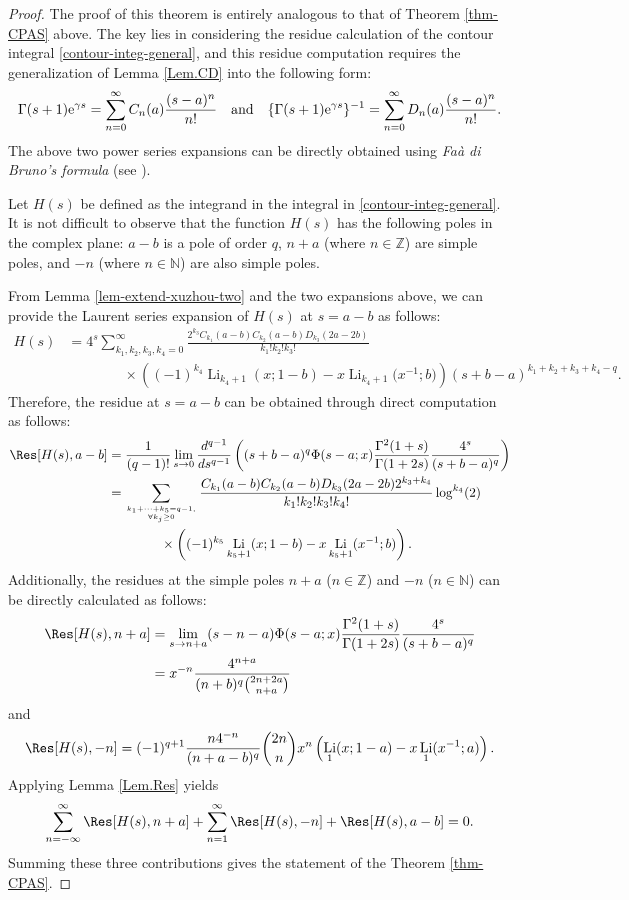 \documentclass[11pt]{article}
\DeclareMathOperator{\Li}{Li}
\theoremstyle{plain}
\theoremstyle{definition}
\begin{document}
\begin{proof}
The proof of this theorem is entirely analogous to that of Theorem \ref{thm-CPAS} above. The key lies in considering the residue calculation of the contour integral \eqref{contour-integ-general}, and this residue computation requires the generalization of Lemma \ref{Lem.CD} into the following form:
\[
\Gamma(s+1){\rm e}^{\gamma s}=\sum_{n=0}^\infty C_n(a)\frac{(s-a)^n}{n!}\quad\text{and}\quad
\{\Gamma(s+1){\rm e}^{\gamma s}\}^{-1}=\sum_{n=0}^\infty D_n(a)\frac{(s-a)^n}{n!}.
\]
The above two power series expansions can be directly obtained using \emph{Fa\`a di Bruno's formula} (see \cite[Sec. 3.4]{C1974}).

Let $H(s)$ be defined as the integrand in the integral in \eqref{contour-integ-general}. It is not difficult to observe that the function \( H(s) \) has the following poles in the complex plane: $a - b $ is a pole of order $q$, $n + a$ (where $n \in \mathbb{Z}$) are simple poles, and $-n$ (where $n \in \mathbb{N}$) are also simple poles.

From Lemma \ref{lem-extend-xuzhou-two} and the two expansions above, we can provide the Laurent series expansion of $H(s)$ at $s = a - b$ as follows:
\begin{align*}
H(s)&=4^s\sum_{k_1,k_2,k_3,k_4=0}^\infty \frac{2^{k_3}C_{k_1}(a-b)C_{k_2}(a-b)D_{k_3}(2a-2b)}{k_1!k_2!k_3!}\nonumber\\
 &\qquad\qquad\times \left((-1)^{k_4}\Li_{k_4+1}(x;1-b)-x \Li_{k_4+1}\Big(x^{-1};b\Big) \right)(s+b-a)^{k_1+k_2+k_3+k_4-q}.
\end{align*}
Therefore, the residue at $s = a - b$ can be obtained through direct computation as follows:
\begin{align*}
\Res[H(s),a-b]&=\frac1{(q-1)!}\lim_{s\rightarrow 0}\frac{d^{q-1}}{ds^{q-1}}\left((s+b-a)^q\Phi(s-a;x) \frac{\Gamma^2(1+s)}{\Gamma(1+2s)}\frac{4^s}{(s+b-a)^q}\right)\\
&=\sum_{k_1+\cdots+k_5=q-1,\atop \forall k_j\geq 0} \frac{C_{k_1}(a-b)C_{k_2}(a-b)D_{k_3}(2a-2b)2^{k_3+k_4}}{k_1!k_2!k_3!k_4!}\log^{k_4}(2)\\
&\qquad\qquad\times\left((-1)^{k_5}\Li_{k_5+1}(x;1-b)-x\Li_{k_5+1}(x^{-1};b)\right).
\end{align*}
Additionally, the residues at the simple poles $n + a$ ($n \in \mathbb{Z}$) and $-n$ ($n \in \mathbb{N}$) can be directly calculated as follows:
\begin{align*}
\Res[H(s),n+a]&=\lim_{s\rightarrow n+a} (s-n-a)\Phi(s-a;x) \frac{\Gamma^2(1+s)}{\Gamma(1+2s)}\frac{4^s}{(s+b-a)^q}\\
&=x^{-n} \frac{4^{n+a}}{(n+b)^q\binom{2n+2a}{n+a}}
\end{align*}
and
\begin{align*}
\Res[H(s),-n]=(-1)^{q+1}\frac{n4^{-n}}{(n+a-b)^{q}}\binom{2n}{n}x^n\left(\Li_1(x;1-a)-x\Li_1(x^{-1};a)\right).
\end{align*}
Applying Lemma \ref{Lem.Res} yields
\begin{align*}
\sum_{n=-\infty}^\infty \Res[H(s),n+a]+\sum_{n=1}^\infty \Res[H(s),-n]+\Res[H(s),a-b]=0.
\end{align*}
Summing these three contributions gives the statement of the Theorem \ref{thm-CPAS}.
\end{proof}
\end{document}
